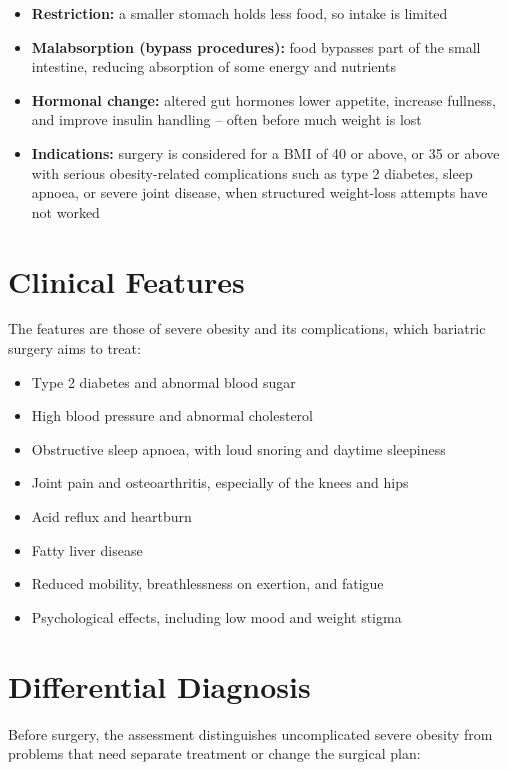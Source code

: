 \begin{itemize}
    \item \textbf{Restriction:} a smaller stomach holds less food, so intake is limited
    \item \textbf{Malabsorption (bypass procedures):} food bypasses part of the small intestine, reducing absorption of some energy and nutrients
    \item \textbf{Hormonal change:} altered gut hormones lower appetite, increase fullness, and improve insulin handling -- often before much weight is lost
    \item \textbf{Indications:} surgery is considered for a BMI of 40 or above, or 35 or above with serious obesity-related complications such as type 2 diabetes, sleep apnoea, or severe joint disease, when structured weight-loss attempts have not worked
\end{itemize}

\section*{Clinical Features}
The features are those of severe obesity and its complications, which bariatric surgery aims to treat:

\begin{itemize}
    \item Type 2 diabetes and abnormal blood sugar
    \item High blood pressure and abnormal cholesterol
    \item Obstructive sleep apnoea, with loud snoring and daytime sleepiness
    \item Joint pain and osteoarthritis, especially of the knees and hips
    \item Acid reflux and heartburn
    \item Fatty liver disease
    \item Reduced mobility, breathlessness on exertion, and fatigue
    \item Psychological effects, including low mood and weight stigma
\end{itemize}

\section*{Differential Diagnosis}
Before surgery, the assessment distinguishes uncomplicated severe obesity from problems that need separate treatment or change the surgical plan:

